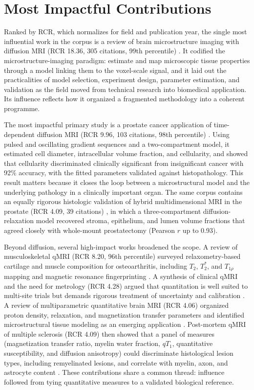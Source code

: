 \documentclass[sn-mathphys,Numbered]{sn-jnl}
\begin{document}
\section{Most Impactful Contributions}\label{sec:impact}
Ranked by RCR, which normalizes for field and publication year, the single most influential work in the corpus is a review of brain microstructure imaging with diffusion MRI (RCR 18.36, 305 citations, 99th percentile) \cite{pmid29193413}.
It codified the microstructure-imaging paradigm: estimate and map microscopic tissue properties through a model linking them to the voxel-scale signal, and it laid out the practicalities of model selection, experiment design, parameter estimation, and validation as the field moved from technical research into biomedical application.
Its influence reflects how it organized a fragmented methodology into a coherent programme.

The most impactful primary study is a prostate cancer application of time-dependent diffusion MRI (RCR 9.96, 103 citations, 98th percentile) \cite{pmid35258368}.
Using pulsed and oscillating gradient sequences and a two-compartment model, it estimated cell diameter, intracellular volume fraction, and cellularity, and showed that cellularity discriminated clinically significant from insignificant cancer with 92\% accuracy, with the fitted parameters validated against histopathology.
This result matters because it closes the loop between a microstructural model and the underlying pathology in a clinically important organ.
The same corpus contains an equally rigorous histologic validation of hybrid multidimensional MRI in the prostate (RCR 4.09, 39 citations) \cite{pmid34751615}, in which a three-compartment diffusion-relaxation model recovered stroma, epithelium, and lumen volume fractions that agreed closely with whole-mount prostatectomy (Pearson $r$ up to 0.93).

Beyond diffusion, several high-impact works broadened the scope.
A review of musculoskeletal qMRI (RCR 8.20, 96th percentile) surveyed relaxometry-based cartilage and muscle composition for osteoarthritis, including $T_2$, $T_2^{*}$, and $T_{1\rho}$ mapping and magnetic resonance fingerprinting \cite{pmid36165880}.
A synthesis of clinical qMRI and the need for metrology (RCR 4.28) argued that quantitation is well suited to multi-site trials but demands rigorous treatment of uncertainty and calibration \cite{pmid33710907}.
A review of multiparametric quantitative brain MRI (RCR 4.06) organized proton density, relaxation, and magnetization transfer parameters and identified microstructural tissue modeling as an emerging application \cite{pmid36040334}.
Post-mortem qMRI of multiple sclerosis (RCR 4.09) then showed that a panel of measures (magnetization transfer ratio, myelin water fraction, $qT_1$, quantitative susceptibility, and diffusion anisotropy) could discriminate histological lesion types, including remyelinated lesions, and correlate with myelin, axon, and astrocyte content \cite{pmid36480267}.
These contributions share a common thread: influence followed from tying quantitative measures to a validated biological reference.
\end{document}
